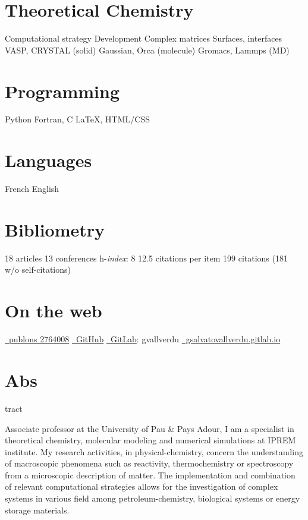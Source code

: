 \documentclass{cv-style}     %
\begin{document}
\begin{aside}
    \section{Theoretical Chemistry}
    Computational strategy
    Development
    Complex matrices
    Surfaces, interfaces
    VASP, CRYSTAL (solid)
    Gaussian, Orca (molecule)
    Gromacs, Lammps (MD)
    \section{Programming}
    {\color{gray}\faPython} Python
    Fortran, C
    \LaTeX{}, HTML/CSS
    \section{Languages}
    French
    English 
    \section{Bibliometry}
    18 articles
    13 conferences
    h-\textit{index}: 8
    12.5 citations per item
    199 citations (181 w/o self-citations)
    \section{On the web}
    \href{https://publons.com/researcher/2764008/}{\color{gray}\faNewspaper\small ~publons 2764008}
    \href{https://github.com/gVallverdu}{\color{gray}\faGithub\small ~GitHub} \href{https://gitlab.com/gvallverdu}{\color{gray}\faGitlab\small ~GitLab}: {\small gvallverdu} 
    \href{https://gsalvatovallverdu.gitlab.io/}{\color{gray}\faFile*[regular]\small ~gsalvatovallverdu.gitlab.io}
\end{aside}

\vspace{0mm}
\section{Abs}{tract}
\vspace{-0.2cm}


Associate professor at the University of Pau \& Pays Adour, I am a specialist in
theoretical chemistry, molecular modeling and numerical simulations at IPREM institute.
My research activities, in physical-chemistry, concern the understanding 
of macroscopic phenomena such as reactivity, thermochemistry or spectroscopy from
a microscopic description of matter. The implementation and combination of relevant computational
strategies allows for the investigation of complex systems in various field among
petroleum-chemistry, biological systems or energy storage materials.
\end{document}
